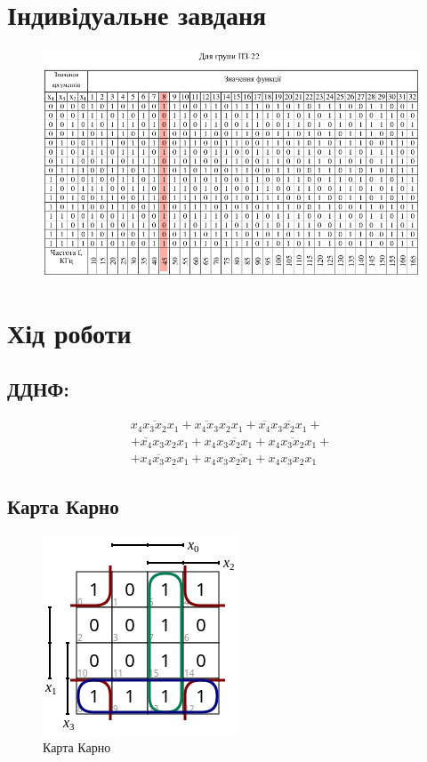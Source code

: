 \documentclass{article}
\begin{document}
\begin{normalsize}
	\section*{Індивідуальне завданя}
	\begin{figure}[H]
		\centering
		\includegraphics[scale=0.8]{v}
	\end{figure}

	\section*{Хід роботи}
	\subsection*{ДДНФ:}
	\begin{Large}
		\begin{gather}
			\overline{x_4x_3x_2x_1}+\overline{x_4x_3}x_2x_1+\overline{x_4}x_3\overline{x_2}x_1+\nonumber\\
			+\overline{x_4}x_3x_2x_1+x_4\overline{x_3x_2x_1}+x_4\overline{x_3x_2}x_1+\nonumber\\
			+x_4\overline{x_3}x_2x_1+
			x_4x_3\overline{x_2x_1}+
			x_4x_3x_2x_1\nonumber
		\end{gather}
	\end{Large}
	
	\subsection*{Карта Карно}
	\begin{figure}[H]
		\centering
		\includegraphics[scale=0.7]{r1}
		\caption{Карта Карно}
	\end{figure}


\end{normalsize}
\end{document}
